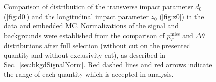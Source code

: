 \begin{figure}[ht!]
\centering
\parbox{0.4725\textwidth}{
  \centering
  \begin{subfigure}[b]{\linewidth}{
                }
  \end{subfigure}
}%
\quad\quad%
\parbox{0.4725\textwidth}{%
  \centering
  \begin{subfigure}[b]{\linewidth}{
                }
  \end{subfigure}
}%
\caption[Comparison of distribution of $d_{0}$ and $z_{0}$ in the data and embedded MC]
{Comparison of distribution of the transverse impact parameter $d_{0}$ (\ref{fig:d0}) and the longitudinal impact parameter $z_{0}$ (\ref{fig:z0}) in the data and embedded MC. Normalizations of the signal and backgrounds were established from the comparison of $p_{T}^{\textrm{miss}}$ and $\Delta\theta$ distributions after full selection (without cut on the presented quantity and without exclusivity cut), as described in Sec.~\ref{sec:bkgdSignalNorm}. Red dashed lines and red arrows indicate the range of each quantity which is accepted in analysis.}\label{fig:d0z0}
\end{figure}






